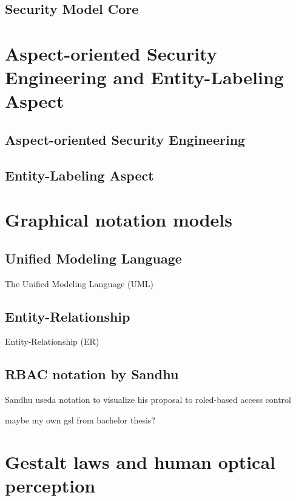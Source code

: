 \documentclass[twoside, openright, 12pt]{book}
\begin{document}
\subsection{Security Model Core}
\label{model_core}



\section{Aspect-oriented Security Engineering and Entity-Labeling Aspect}
\label{AOSEEL}


\subsection{Aspect-oriented Security Engineering}
\label{AOSE}


\subsection{Entity-Labeling Aspect}
\label{EL}




\section{Graphical notation models}
\label{graphical_notations}

\subsection{Unified Modeling Language}
\label{UML}
The Unified Modeling Language (UML)

\subsection{Entity-Relationship}
\label{ER}
Entity-Relationship (ER)

\subsection{RBAC notation by Sandhu}
\label{RBAC_notation}
Sandhu useda notation to visualize his proposal to roled-based access control

maybe my own gsl from bachelor thesis?



\section{Gestalt laws and human optical perception}
\label{gestalt_laws_and_human_optical_perception}
\end{document}
